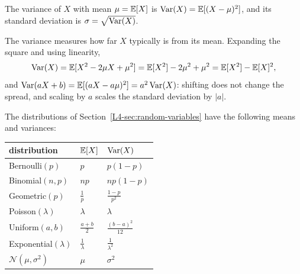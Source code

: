 \begin{definition}[Variance]\label{L4-def:variance}
    The variance of $X$ with mean $\mu = \mathbb{E}[X]$ is $\operatorname{Var}(X) = \mathbb{E}[(X - \mu)^2]$, and its standard deviation is $\sigma = \sqrt{\operatorname{Var}(X)}$.
\end{definition}

The variance measures how far $X$ typically is from its mean. Expanding the square and using linearity,
\[\operatorname{Var}(X) = \mathbb{E}[X^2 - 2\mu X + \mu^2] = \mathbb{E}[X^2] - 2\mu^2 + \mu^2 = \mathbb{E}[X^2] - \mathbb{E}[X]^2,\]
and $\operatorname{Var}(aX + b) = \mathbb{E}[(aX - a\mu)^2] = a^2\operatorname{Var}(X)$: shifting does not change the spread, and scaling by $a$ scales the standard deviation by $|a|$.

\begin{proposition}\label{L4-prop:moments}
    The distributions of Section~\ref{L4-sec:random-variables} have the following means and variances:
    \begin{center}
        \renewcommand{\arraystretch}{1.3}
        \begin{tabular}{lll}
            \hline
            distribution & $\mathbb{E}[X]$ & $\operatorname{Var}(X)$ \\
            \hline
            Bernoulli$(p)$ & $p$ & $p(1 - p)$ \\
            Binomial$(n, p)$ & $np$ & $np(1 - p)$ \\
            Geometric$(p)$ & $\frac{1}{p}$ & $\frac{1 - p}{p^2}$ \\
            Poisson$(\lambda)$ & $\lambda$ & $\lambda$ \\
            Uniform$(a, b)$ & $\frac{a + b}{2}$ & $\frac{(b - a)^2}{12}$ \\
            Exponential$(\lambda)$ & $\frac{1}{\lambda}$ & $\frac{1}{\lambda^2}$ \\
            $\mathcal{N}(\mu, \sigma^2)$ & $\mu$ & $\sigma^2$ \\
            \hline
        \end{tabular}
    \end{center}
\end{proposition}

